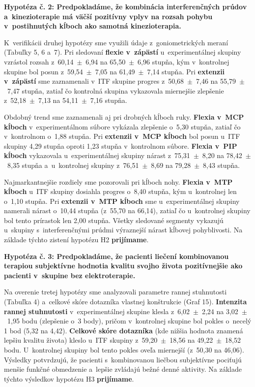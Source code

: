 \textbf{Hypotéza č. 2: Predpokladáme, že kombinácia interferenčných prúdov a~kinezioterapie má väčší pozitívny vplyv na rozsah pohybu v~postihnutých kĺboch ako samotná kinezioterapia.}

K~verifikácii druhej hypotézy sme využili údaje z~goniometrických meraní (Tabuľky 5, 6 a~7). Pri sledovaní \textbf{flexie v~zápästí} u~experimentálnej skupiny vzrástol rozsah z~60,14~$\pm$~6,94 na 65,50~$\pm$~6,96 stupňa, kým v~kontrolnej skupine bol posun z~59,54~$\pm$~7,05 na 61,49~$\pm$~7,14 stupňa. Pri \textbf{extenzii v~zápästí} sme zaznamenali v~ITF skupine progres z~50,68~$\pm$~7,46 na 55,79~$\pm$~7,47 stupňa, zatiaľ čo kontrolná skupina vykazovala miernejšie zlepšenie z~52,18~$\pm$~7,13 na 54,11~$\pm$~7,16 stupňa.

Obdobný trend sme zaznamenali aj pri drobných kĺboch ruky. \textbf{Flexia v~MCP kĺboch} v~experimentálnom súbore vykázala zlepšenie o~5,30 stupňa, zatiaľ čo v~kontrolnom o~1,88 stupňa. Pri \textbf{extenzii v~MCP kĺboch} bol posun u~ITF skupiny 4,29 stupňa oproti 1,23 stupňa v~kontrolnom súbore. \textbf{Flexia v~PIP kĺboch} vykazovala u~experimentálnej skupiny nárast z~75,31~$\pm$~8,20 na 78,42~$\pm$~8,35 stupňa a~u~kontrolnej skupiny z~76,51~$\pm$~8,69 na 79,28~$\pm$~8,43 stupňa.

Najmarkantnejšie rozdiely sme pozorovali pri kĺboch nohy. \textbf{Flexia v~MTP kĺboch} u~ITF skupiny dosiahla progres o~8,40 stupňa, kým u~kontrolnej len o~1,10 stupňa. Pri \textbf{extenzii v~MTP kĺboch} sme u~experimentálnej skupiny namerali nárast o~10,44 stupňa (z~55,70 na 66,14), zatiaľ čo u~kontrolnej skupiny bol tento prírastok len 2,00 stupňa. Všetky sledované segmenty vykazujú u~skupiny s~interferenčnými prúdmi výraznejší nárast kĺbovej pohyblivosti. Na základe týchto zistení hypotézu H2 \textbf{prijímame}.

\textbf{Hypotéza č. 3: Predpokladáme, že pacienti liečení kombinovanou terapiou subjektívne hodnotia kvalitu svojho života pozitívnejšie ako pacienti v~skupine bez elektroterapie.}

Na overenie tretej hypotézy sme analyzovali parametre rannej stuhnutosti (Tabuľka 4) a~celkové skóre dotazníka vlastnej konštrukcie (Graf 15). \textbf{Intenzita rannej stuhnutosti} v~experimentálnej skupine klesla z~6,02~$\pm$~2,24 na 3,02~$\pm$~1,95 bodu (zlepšenie o~3 body), pričom v~kontrolnej skupine bol pokles o~necelý 1 bod (5,32 na 4,42). \textbf{Celkové skóre dotazníka} (kde nižšia hodnota znamená lepšiu kvalitu života) kleslo u~ITF skupiny z~59,20~$\pm$~18,56 na 49,22~$\pm$~18,52 bodu. U~kontrolnej skupiny bol tento pokles oveľa miernejší (z~50,30 na 46,06). Výsledky potvrdzujú, že pacienti s~kombinovanou liečbou subjektívne pociťujú menšie funkčné obmedzenie a~lepšie zvládajú bežné denné aktivity. Na základe týchto výsledkov hypotézu H3 \textbf{prijímame}.


